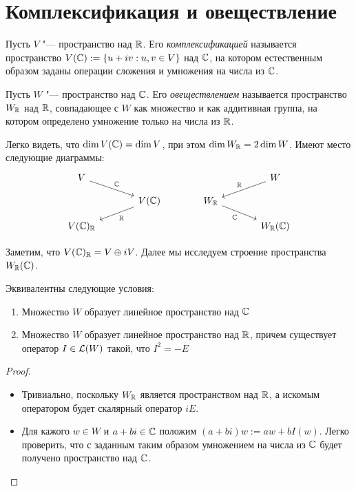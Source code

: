 \section{Комплексификация и овеществление}

\begin{definition}
	Пусть $V$ "--- пространство над $\mathbb{R}$. Его \textit{комплексификацией} называется пространство $V(\mathbb{C}) := \{u + iv : u, v \in V\}$ над $\mathbb{C}$, на котором естественным образом заданы операции сложения и умножения на числа из $\mathbb{C}$.
\end{definition}

\begin{definition}
	Пусть $W$ "--- пространство над $\mathbb{C}$. Его \textit{овеществлением} называется пространство $W_{\mathbb{R}}$ над $\mathbb{R}$, совпадающее с $W$ как множество и как аддитивная группа, на котором определено умножение только на числа из $\mathbb{R}$.
\end{definition}

\begin{note}
	Легко видеть, что $\dim{V(\mathbb{C})} = \dim{V}$, при этом $\dim{W_{\mathbb{R}}} = 2\dim{W}$. Имеют место следующие диаграммы:
	\[
	\begin{tikzcd}[
		row sep = small,
		column sep = large
		]
		V \arrow{dr}{\Cm} &  & & \arrow[swap]{dl}{\R} W\\
		& \arrow{dl}{\R} V(\Cm) & W_\R \arrow[swap]{dr}{\Cm} & \\
		V(\Cm)_\R & & & W_\R(\Cm)
	\end{tikzcd}
	\]
	
	Заметим, что $V(\mathbb{C})_{\mathbb{R}} = V \oplus iV$. Далее мы исследуем строение пространства $W_{\mathbb{R}}(\mathbb{C})$.
\end{note}

\begin{proposition}
	Эквивалентны следующие условия:
	\begin{enumerate}
		\item Множество $W$ образует линейное пространство над $\mathbb{C}$
		\item Множество $W$ образует линейное пространство над $\mathbb{R}$, причем существует оператор $I \in \mathcal L(W)$ такой, что $I^2 = -E$
	\end{enumerate}
\end{proposition}

\begin{proof}~
	\begin{itemize}
		\item{}Тривиально, поскольку $W_{\mathbb{R}}$ является пространством над $\mathbb{R}$, а искомым оператором будет скалярный оператор $iE$.
		\item{}Для кажого $w \in W$ и $a + bi \in \mathbb{C}$ положим $(a + bi)w := aw + bI(w)$. Легко проверить, что с заданным таким образом умножением на числа из $\mathbb{C}$ будет получено пространство над $\mathbb{C}$.\qedhere
	\end{itemize}
\end{proof}

